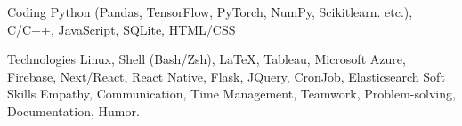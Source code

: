 

\begin{cvskills}

  \cvskill
    {Coding} %
    {Python (Pandas, TensorFlow, PyTorch, NumPy, Scikit\-learn. etc.), C/C++, JavaScript, SQLite, HTML/CSS} %

  \cvskill
    {Technologies} %
    {Linux, Shell (Bash/Zsh), \LaTeX, Tableau, Microsoft Azure, Firebase, Next/React, React Native, Flask, JQuery, CronJob, Elasticsearch} %
  \cvskill
    {Soft Skills} %
    {Empathy, Communication, Time Management, Teamwork, Problem-solving, Documentation, Humor.} %
    

\end{cvskills}
